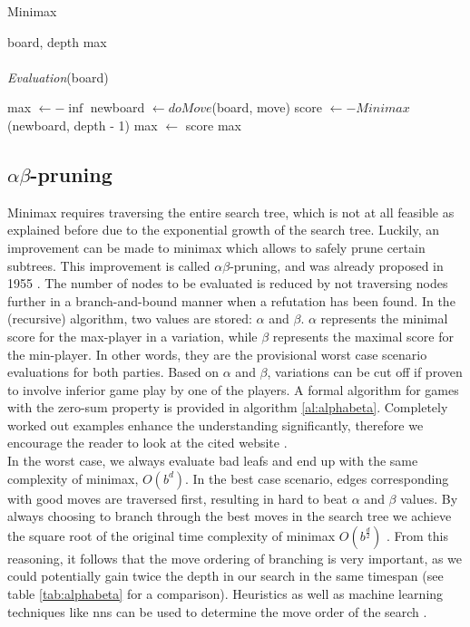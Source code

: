 \begin{algorithm}
  \caption{Minimax}
  \label{al:minimax}
  \begin{algorithmic}
  \REQUIRE board, depth
  \ENSURE  max \\
   \\
  \RETURN \textit{Evaluation}(board) 
  \ENDIF

  \STATE max $\leftarrow -\inf$ 
  \STATE newboard $\leftarrow doMove$(board, move)
  \STATE score $\leftarrow -Minimax$(newboard, depth - 1)
  \STATE max $\leftarrow$ score
  \ENDIF
  \ENDFOR
  \RETURN max
  \end{algorithmic}
\end{algorithm}


\subsection{$\alpha \beta$-pruning}
\label{subsec:alphabeta}
Minimax requires traversing the entire search tree, which is not at all feasible as explained before due to the exponential growth of the search tree. Luckily, an improvement can be made to minimax which allows to safely prune certain subtrees. This improvement is called $\alpha \beta$-pruning, and was already proposed in 1955 \cite{mccarthy55}. The number of nodes to be evaluated is reduced by not traversing nodes further in a branch-and-bound manner when a refutation has been found. In the (recursive) algorithm, two values are stored: $\alpha$ and $\beta$. $\alpha$ represents the minimal score for the max-player in a variation, while $\beta$ represents the maximal score for the min-player. In other words, they are the provisional worst case scenario evaluations for both parties. Based on $\alpha$ and $\beta$, variations can be cut off if proven to involve inferior game play by one of the players. A formal algorithm for games with the zero-sum property is provided in algorithm \ref{al:alphabeta}. Completely worked out examples enhance the understanding significantly, therefore we encourage the reader to look at the cited website \cite{abpractice}. \\
In the worst case, we always evaluate bad leafs and end up with the same complexity of minimax, $O(b^d)$. In the best case scenario, edges corresponding with good moves are traversed first, resulting in hard to beat $\alpha$ and $\beta$ values. By always choosing to branch through the best moves in the search tree we achieve the square root of the original time complexity of minimax $O(b^{\frac{d}{2}})$ \cite{stuart2003}. From this reasoning, it follows that the move ordering of branching is very important, as we could potentially gain twice the depth in our search in the same timespan (see table \ref{tab:alphabeta} for a comparison). Heuristics as well as machine learning techniques like \acrlong{nn}s can be used to determine the move order of the search \cite{hashmoveorder05,nnmovemap02}.

